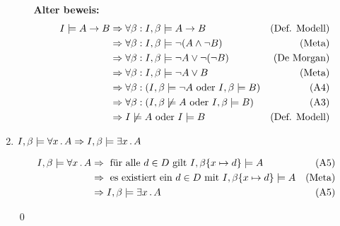 \begin{enumerate}
\begin{enumerate}
		\textbf{Alter beweis:}
		\begin{align*}
				I \models A \to B  & \Rightarrow \forall \beta : I, \beta \models A \to B 			& (\text{Def. Modell})\\
				& \Rightarrow \forall \beta : I, \beta \models \lnot(A \land \lnot B) 					& (\text{Meta})\\
				& \Rightarrow \forall \beta : I, \beta \models \lnot A \lor \lnot(\lnot B) 			& (\text{De Morgan})\\
				& \Rightarrow \forall \beta : I, \beta \models \lnot A \lor B 							& (\text{Meta})\\
				& \Rightarrow \forall \beta : (I, \beta \models \lnot A \text{ oder } I, \beta \models B ) 	& (\text{A4})\\
				& \Rightarrow \forall \beta : (I, \beta \not\models A \text{ oder } I, \beta \models B ) 	& (\text{A3})\\
				& \Rightarrow I \not\models A \text{ oder } I \models B 							& (\text{Def. Modell})\\
		\end{align*}		
		
	\end{enumerate}
	
	\item $I, \beta \models \forall x \, . \, A \Rightarrow I, \beta \models\exists x \, . \, A $
	
		\begin{align*}
			I, \beta \models \forall x \, . \, A & \Rightarrow \text{ für alle $d\in D$ gilt } I, \beta \{x \mapsto d\} \models A & (\text{A5})\\
			& \Rightarrow \text{ es existiert ein $d\in D$ mit } I, \beta \{x \mapsto d\} \models A & (\text{Meta})\\
			& \Rightarrow I, \beta \models\exists x \, . \, A & (\text{A5})
		\end{align*}
	
	
	\qed
\end{enumerate}


